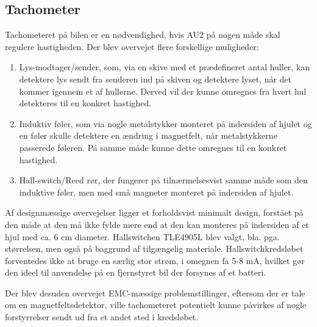 \subsection{Tachometer}

Tachometeret på bilen er en nødvendighed, hvis AU2 på nogen måde skal regulere hastigheden. Der blev overvejet flere forskellige muligheder:
\begin{enumerate}
	\item Lys-modtager/sender, som, via en skive med et prædefineret antal huller, kan detektere lys sendt fra senderen ind på skiven og detektere lyset, når det kommer igennem et af hullerne. Derved vil der kunne omregnes fra hvert hul detekteres til en konkret hastighed.
	\item Induktiv føler, som via nogle metalstykker monteret på indersiden af hjulet og en føler skulle detektere en ændring i magnetfelt, når metalstykkerne passerede føleren. På samme måde kunne dette omregnes til en konkret hastighed.
	\item Hall-switch/Reed rør, der fungerer på tilnærmelsesvist samme måde som den induktive føler, men med små magneter monteret på indersiden af hjulet. 
\end{enumerate}

Af designmæssige overvejelser ligger et forholdsvist minimalt design, forstået på den måde at den må ikke fylde mere end at den kan monteres på indersiden af et hjul med ca. 6 cm diameter. Hallswitchen TLE4905L \cite{lib:TLE4905L} blev valgt, bla. pga. størrelsen, men også på baggrund af tilgængelig materiale. Hallswitchkredsløbet forventedes ikke at bruge en særlig stor strøm, i omegnen fa 5-8 mA, hvilket gør den ideel til anvendelse på en fjernstyret bil der forsynes af et batteri. 

Der blev desuden overvejet EMC-mæssige problemstillinger, eftersom der er tale om en magnetfeltsdetektor, ville tachometeret potentielt kunne påvirkes af nogle forstyrrelser sendt ud fra et andet sted i kredsløbet.